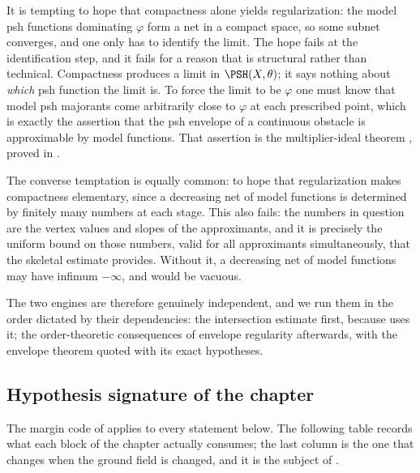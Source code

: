 It is tempting to hope that compactness alone yields regularization: the
model psh functions dominating $\varphi$ form a net in a compact space, so
some subnet converges, and one only has to identify the limit.  The hope
fails at the identification step, and it fails for a reason that is
structural rather than technical.  Compactness produces a limit in
$\PSH(X,\theta)$; it says nothing about \emph{which} psh function the
limit is.  To force the limit to be $\varphi$ one must know that model psh
majorants come arbitrarily close to $\varphi$ at each prescribed point,
which is exactly the assertion that the psh envelope of a continuous
obstacle is approximable by model functions.  That assertion is the
multiplier-ideal theorem , proved in
.

The converse temptation is equally common: to hope that regularization makes
compactness elementary, since a decreasing net of model functions is
determined by finitely many numbers at each stage.  This also fails: the
numbers in question are the vertex values and slopes of the approximants,
and it is precisely the uniform bound on those numbers, valid for all
approximants simultaneously, that the skeletal estimate provides.  Without
it, a decreasing net of model functions may have infimum $-\infty$, and
 would be vacuous.

The two engines are therefore genuinely independent, and we run them in the
order dictated by their dependencies: the intersection estimate first,
because  uses it; the order-theoretic
consequences of envelope regularity afterwards, with the envelope theorem
quoted with its exact hypotheses.

\subsection{Hypothesis signature of the chapter}
\label{sec:ch22-signature}

The margin code of  applies to every statement
below.  The following table records what each block of the chapter actually
consumes; the last column is the one that changes when the ground field is
changed, and it is the subject of .


